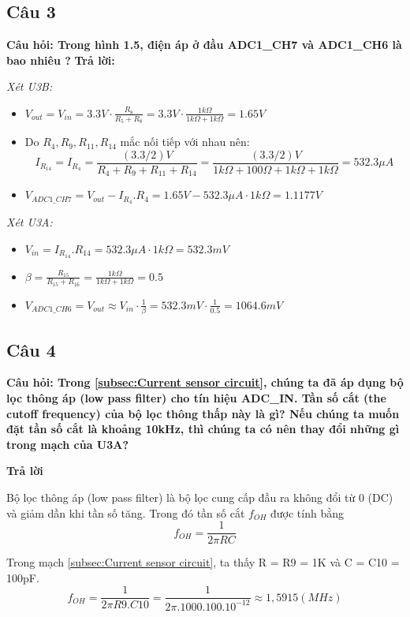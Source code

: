 \pagebreak
\subsection{Câu 3}
\textbf{Câu hỏi: Trong hình 1.5, điện áp ở đầu ADC1\_CH7 và ADC1\_CH6 là bao nhiêu ?}
\textbf{Trả lời:}

\textit{Xét U3B:}
\begin{itemize}
    \item $V_{out} = V_{in} = 3.3V \cdot \frac{R_8}{R_5 + R_8} = 3.3V \cdot \frac{1k\Omega}{1k\Omega + 1k\Omega} = 1.65V$
    \item Do $R_4, R_9, R_{11}, R_{14}$ mắc nối tiếp với nhau nên: \[I_{R_{14}} = I_{R_4} = \frac{(3.3 / 2) V}{R_4 + R_9 + R_{11} + R_{14}} = \frac{(3.3 / 2) V}{1k\Omega + 100\Omega + 1k\Omega + 1k\Omega} = 532.3 \mu A \]
    \item $V_{ADC1\_CH7} = V_{out} - I_{R_4}.R_4 = 1.65V  - 532.3 \mu A \cdot 1k\Omega = 1.1177V$
\end{itemize}
\textit{Xét U3A:}
\begin{itemize}
    \item $V_{in} = I_{R_{14}}.R_{14} = 532.3 \mu A \cdot 1k\Omega = 532.3mV$
    \item $\beta = \frac{R_{15}}{R_{15} + R_{16}} = \frac{1k\Omega}{1k\Omega + 1k\Omega} = 0.5$
    \item $V_{ADC1\_CH6} = V_{out} \approx V_{in} \cdot \frac{1}{\beta} = 532.3mV \cdot \frac{1}{0.5} = 1064.6mV$
\end{itemize}
\pagebreak
\subsection{Câu 4}
\textbf{Câu hỏi: Trong \ref{subsec:Current sensor circuit}, chúng ta đã áp dụng bộ lọc thông áp (low pass filter) cho tín hiệu ADC\_IN. Tần số cắt (the cutoff frequency) của bộ lọc thông thấp này là gì? Nếu chúng ta muốn đặt tần số cắt là khoảng 10kHz, thì
chúng ta có nên thay đổi những gì trong mạch của U3A?}

\textbf{Trả lời}

Bộ lọc thông áp (low pass filter) là bộ lọc cung cấp đầu ra không đổi từ 0 (DC) và giảm dần khi tần số tăng. Trong đó tần số cắt $f_{OH}$ được tính bằng
\[f_{OH} = \dfrac{1}{2\pi RC}\]

Trong mạch \ref{subsec:Current sensor circuit}, ta thấy R = R9 = 1K và C = C10 = 100pF.
\[f_{OH} = \dfrac{1}{2\pi R9.C10} = \dfrac{1}{2\pi .1000.100.10^{-12}} \approx 1,5915 (MHz)\]

